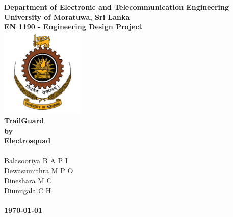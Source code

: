 \begin{titlepage}
\center %

\textbf{\large Department of Electronic and Telecommunication Engineering}\\[0.5cm]
\textbf{\Large University of Moratuwa, Sri Lanka}\\[1cm]
\textbf{\large EN 1190 - Engineering Design Project}\\[2cm]
\includegraphics[width=0.3\textwidth]{figures/uomlogo}\\[2cm]


	
\textbf{\Huge TrailGuard\\[1cm]by \\[0.5cm] Electrosquad}\\[2cm]



\textbf{\large }\\[0.5cm]
{\large Balasooriya B A P I} \hspace{1.3cm}{\large 220054N  }\\
{\large Dewasumithra M P O} \hspace{1cm}{\large 220112R  }\\
{\large Dineshara M C} \hspace{2.3cm}{\large 220128V  }\\
{\large Diunugala C H} \hspace{2.3cm}{\large 220143L}\\[1cm]

\textbf{\large}\\[0.5cm]
\textbf{\Large \today} %


\vfill %

\end{titlepage}